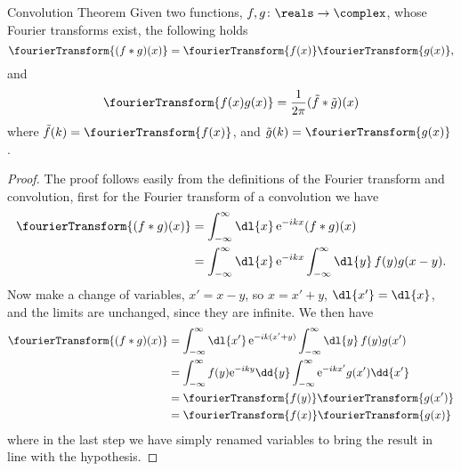 \documentclass[fleqn]{NotesClass}
\newcommand*{\e}{\mathrm{e}}
\begin{document}
    \begin{thm}{Convolution Theorem}{}
        Given two functions, \(f, g\colon \reals \to \complex\), whose Fourier transforms exist, the following holds
        \begin{equation}
            \fourierTransform\{ (f \ast g)(x) \} = \fourierTransform\{f(x)\}\fourierTransform\{g(x)\},
        \end{equation}
        and
        \begin{equation}
            \fourierTransform\{ f(x)g(x) \} = \frac{1}{2\pi} (\tilde{f} \ast \tilde{g})(x)
        \end{equation}
        where \(\tilde{f}(k) = \fourierTransform\{ f(x) \}\), and \(\tilde{g}(k) = \fourierTransform\{ g(x) \}\).
        
        \begin{proof}
            The proof follows easily from the definitions of the Fourier transform and convolution, first for the Fourier transform of a convolution we have
            \begin{align}
                \fourierTransform\{ (f \ast g)(x) \} &= \int_{-\infty}^{\infty} \dl{x} \, \e^{-ikx} (f \ast g)(x)\\
                &= \int_{-\infty}^{\infty} \dl{x} \, \e^{-ikx} \int_{-\infty}^{\infty} \dl{y} \, f(y)g(x - y).
            \end{align}
            Now make a change of variables, \(x' = x - y\), so \(x = x' + y\), \(\dl{x'} = \dl{x}\), and the limits are unchanged, since they are infinite.
            We then have
            \begin{align}
                \fourierTransform\{ (f \ast g)(x) \} &= \int_{-\infty}^{\infty} \dl{x'} \, \e^{-ik(x' + y)} \int_{-\infty}^{\infty} \dl{y} \, f(y)g(x')\\
                &= \int_{-\infty}^{\infty} f(y) \e^{-iky} \dd{y} \int_{-\infty}^{\infty} \e^{-ikx'} g(x') \dd{x'}\\
                &= \fourierTransform\{ f(y) \} \fourierTransform\{ g(x') \}\\
                &= \fourierTransform\{ f(x) \} \fourierTransform\{ g(x) \}
            \end{align}
            where in the last step we have simply renamed variables to bring the result in line with the hypothesis.
            

\end{proof}
\end{thm}
\end{document}
